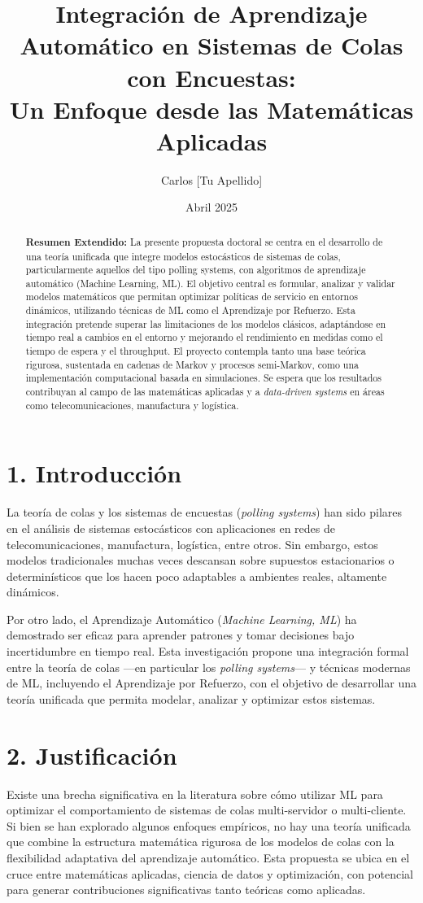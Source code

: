 \documentclass[12pt]{article}
\title{Integraci\'on de Aprendizaje Autom\'atico en Sistemas de Colas con Encuestas: \\ Un Enfoque desde las Matem\'aticas Aplicadas}
\author{Carlos [Tu Apellido]}
\date{Abril 2025}
\begin{document}
\maketitle

\begin{abstract}
\textbf{Resumen Extendido:} 
La presente propuesta doctoral se centra en el desarrollo de una teor\'ia unificada que integre modelos estoc\'asticos de sistemas de colas, particularmente aquellos del tipo polling systems, con algoritmos de aprendizaje autom\'atico (Machine Learning, ML). El objetivo central es formular, analizar y validar modelos matem\'aticos que permitan optimizar pol\'iticas de servicio en entornos din\'amicos, utilizando t\'ecnicas de ML como el Aprendizaje por Refuerzo. Esta integraci\'on pretende superar las limitaciones de los modelos cl\'asicos, adapt\'andose en tiempo real a cambios en el entorno y mejorando el rendimiento en medidas como el tiempo de espera y el throughput. El proyecto contempla tanto una base te\'orica rigurosa, sustentada en cadenas de Markov y procesos semi-Markov, como una implementaci\'on computacional basada en simulaciones. Se espera que los resultados contribuyan al campo de las matem\'aticas aplicadas y a \textit{data-driven systems} en \'areas como telecomunicaciones, manufactura y log\'istica.
\end{abstract}

\section*{1. Introducci\'on}
La teor\'ia de colas y los sistemas de encuestas (\textit{polling systems}) han sido pilares en el an\'alisis de sistemas estoc\'asticos con aplicaciones en redes de telecomunicaciones, manufactura, log\'istica, entre otros. Sin embargo, estos modelos tradicionales muchas veces descansan sobre supuestos estacionarios o determin\'isticos que los hacen poco adaptables a ambientes reales, altamente din\'amicos.

Por otro lado, el Aprendizaje Autom\'atico (\textit{Machine Learning, ML}) ha demostrado ser eficaz para aprender patrones y tomar decisiones bajo incertidumbre en tiempo real. Esta investigaci\'on propone una integraci\'on formal entre la teor\'ia de colas ---en particular los \textit{polling systems}--- y t\'ecnicas modernas de ML, incluyendo el Aprendizaje por Refuerzo, con el objetivo de desarrollar una teor\'ia unificada que permita modelar, analizar y optimizar estos sistemas.

\section*{2. Justificaci\'on}
Existe una brecha significativa en la literatura sobre c\'omo utilizar ML para optimizar el comportamiento de sistemas de colas multi-servidor o multi-cliente. Si bien se han explorado algunos enfoques emp\'iricos, no hay una teor\'ia unificada que combine la estructura matem\'atica rigurosa de los modelos de colas con la flexibilidad adaptativa del aprendizaje autom\'atico. Esta propuesta se ubica en el cruce entre matem\'aticas aplicadas, ciencia de datos y optimizaci\'on, con potencial para generar contribuciones significativas tanto te\'oricas como aplicadas.
\end{document}
